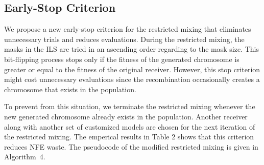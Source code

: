 \subsection{Early-Stop Criterion}

We propose a new early-stop criterion for the restricted mixing that eliminates unnecessary trials and reduces evaluations. 
During the restricted mixing, the masks in the ILS are tried in an ascending order regarding to the mask size. 
This bit-flipping process stops only if the fitness of the generated chromosome is greater or equal to the fitness of the original receiver. 
However, this stop criterion might cost unnecessary evaluations since the recombination occasionally creates a chromosome that exists in the population. 


To prevent from this situation, we terminate the restricted mixing whenever the new generated chromosome already exists in the population. 
Another receiver along with another set of customized models are chosen for the next iteration of the restricted mixing. 
The emperical results in Table 2 shows that this criterion reduces NFE waste. 
The pseudocode of the modified restricted mixing is given in Algorithm~4.


